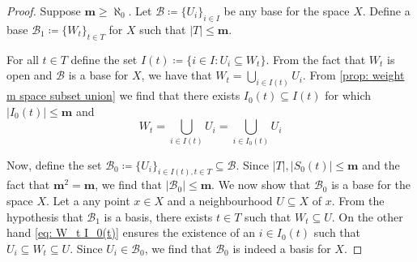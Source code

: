 \begin{proof}
Suppose \(\mathbf m \geq \aleph_0\). Let \(\mathcal B \coloneq \{U_i\}_{i \in I}\)
be any base for the space \(X\). Define a base \(\mathcal B_1 \coloneq \{W_t\}_{t
\in T}\) for \(X\) such that \(|T| \leq \mathbf m\).

For all \(t \in T\) define the set \(I(t) \coloneq \{i \in I \colon U_i \subseteq
W_t\}\). From the fact that \(W_t\) is open and \(\mathcal B\) is a base for
\(X\), we have that \(W_t = \bigcup_{i \in  I(t)} U_i\).  From \cref{prop:
weight m space subset union} we find that there exists \(I_0(t) \subseteq
I(t)\) for which \(|I_0(t)| \leq \mathbf m\) and
\begin{equation}\label{eq: W_t I_0(t)}
  W_t = \bigcup_{i \in  I(t)} U_i = \bigcup_{i \in  I_0(t)} U_i
\end{equation}

Now, define the set \(\mathcal B_0 \coloneq \{U_i\}_{i \in I(t), t \in T} \subseteq
\mathcal B\). Since \(|T|, |S_0(t)| \leq \mathbf m\) and the fact that
\(\mathbf m^2 = \mathbf m\), we find that \(|\mathcal B_0| \leq \mathbf m\).
We now show that \(\mathcal B_0\) is a base for the space \(X\). Let a any
point \(x \in X\) and a neighbourhood \(U \subseteq X\) of \(x\). From the
hypothesis that \(\mathcal B_1\) is a basis, there exists \(t \in T\) such
that \(W_t \subseteq U\). On the other hand \cref{eq: W_t I_0(t)} ensures the
existence of an \(i \in I_0(t)\) such that \(U_i \subseteq W_t \subseteq U\).
Since \(U_i \in \mathcal B_0\), we find that \(\mathcal B_0\) is indeed a
basis for \(X\).
\end{proof}

